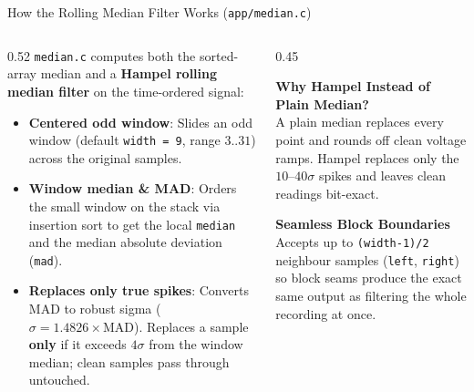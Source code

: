 \begin{frame}{How the Rolling Median Filter Works (\texttt{app/median.c})}
  \begin{columns}[t, onlytextwidth]
    \begin{column}{0.52\textwidth}
      \smalltext\compactitem
      \texttt{median.c} computes both the sorted-array median and a \textbf{Hampel rolling median filter} on the time-ordered signal:
      \begin{itemize}
        \item \textbf{Centered odd window}: Slides an odd window (default \texttt{width = 9}, range $3..31$) across the original samples.
        \item \textbf{Window median \& MAD}: Orders the small window on the stack via insertion sort to get the local \texttt{median} and the median absolute deviation (\texttt{mad}).
        \item \textbf{Replaces only true spikes}: Converts MAD to robust sigma ($\sigma = 1.4826 \times \text{MAD}$). Replaces a sample \textbf{only} if it exceeds $4\sigma$ from the window median; clean samples pass through untouched.
      \end{itemize}
    \end{column}
    \begin{column}{0.45\textwidth}
      \smalltext\compactitem
      \begin{highlight}
        \textbf{Why Hampel Instead of Plain Median?} \\
        A plain median replaces every point and rounds off clean voltage ramps. Hampel replaces only the $10$--$40\sigma$ spikes and leaves clean readings bit-exact.
      \end{highlight}
      \vskip0.5mm
      \begin{tech}
        \textbf{Seamless Block Boundaries} \\
        Accepts up to \texttt{(width-1)/2} neighbour samples (\texttt{left}, \texttt{right}) so block seams produce the exact same output as filtering the whole recording at once.
      \end{tech}
    \end{column}
  \end{columns}
\end{frame}

